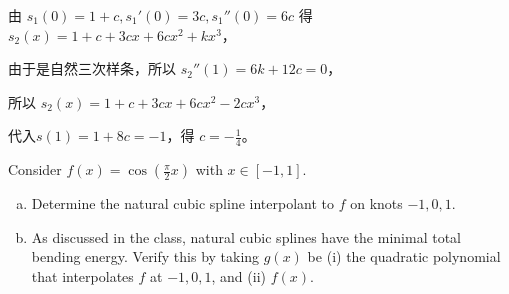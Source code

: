 \documentclass[lang=cn,a4paper,newtx,bibend=bibtex]{elegantpaper}
\begin{document}
\begin{solution}
由 $s_1(0) = 1 + c,  s_1'(0) = 3c, s_1''(0) = 6c$ 得 $s_2(x) = 1 + c + 3cx + 6cx^2 + kx^3$，

由于是自然三次样条，所以 $s_2''(1) = 6k + 12c = 0$，

所以 $s_2(x) = 1+c+3cx+6cx^2-2cx^3$，

代入$s(1)=1+8c=-1$，得 $c = -\frac{1}{4}$。
\end{solution}

\begin{prob}[3.6.1-\textrm{IV}.]
  Consider $f(x)=\cos\left(\frac{\pi}{2}x\right)$ with $x\in[-1,1]$.
  \begin{enumerate}[(a)]
    \item Determine the natural cubic spline interpolant to $f$ on knots $-1,0,1$.
    \item As discussed in the class, natural cubic splines have the minimal total bending energy. Verify this by taking $g(x)$ be ($\mathrm{i}$) the quadratic polynomial that interpolates $f$ at $-1,0,1$, and ($\mathrm{ii}$) $f(x)$.
  \end{enumerate}
\end{prob}
\end{document}
